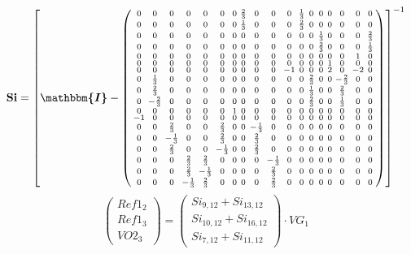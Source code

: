 \documentclass[10pt]{article} \usepackage{amsmath} \usepackage{bbold}
\begin{document}
\[ \mathbf{Si} = \left[ \boldsymbol{\mathbbm{I}}  -
\left(\begin{smallmatrix} 0 & 0 & 0 & 0 & 0 & 0 & 0 & \frac{2}{3} & 0
& 0 & 0 & \frac{1}{3} & 0 & 0 & 0 & 0 & 0 & 0 \\ 0 & 0 & 0 & 0 & 0 & 0
& 0 & \frac{1}{3} & 0 & 0 & 0 & \frac{2}{3} & 0 & 0 & 0 & 0 & 0 & 0 \\
0 & 0 & 0 & 0 & 0 & 0 & 0 & 0 & 0 & 0 & 0 & 0 & 0 & \frac{1}{3} & 0 &
0 & 0 & \frac{2}{3} \\ 0 & 0 & 0 & 0 & 0 & 0 & 0 & 0 & 0 & 0 & 0 & 0 &
0 & \frac{2}{3} & 0 & 0 & 0 & \frac{1}{3} \\ 0 & 0 & 0 & 0 & 0 & 0 & 0
& 0 & 0 & 0 & 0 & 0 & 0 & 0 & 0 & 0 & 1 & 0 \\ 0 & 0 & 0 & 0 & 0 & 0 &
0 & 0 & 0 & 0 & 0 & 0 & 0 & 0 & 1 & 0 & 0 & 0 \\ 0 & 0 & 0 & 0 & 0 & 0
& 0 & 0 & 0 & 0 & -1 & 0 & 0 & 0 & 2 & 0 & -2 & 0 \\ 0 & \frac{1}{3} &
0 & 0 & 0 & 0 & 0 & 0 & 0 & 0 & 0 & 0 & \frac{2}{3} & 0 & 0 &
-\frac{2}{3} & 0 & 0 \\ 0 & \frac{2}{3} & 0 & 0 & 0 & 0 & 0 & 0 & 0 &
0 & 0 & 0 & \frac{1}{3} & 0 & 0 & \frac{2}{3} & 0 & 0 \\ 0 &
-\frac{2}{3} & 0 & 0 & 0 & 0 & 0 & 0 & 0 & 0 & 0 & 0 & \frac{2}{3} & 0
& 0 & \frac{1}{3} & 0 & 0 \\ 0 & 0 & 0 & 0 & 0 & 0 & 1 & 0 & 0 & 0 & 0
& 0 & 0 & 0 & 0 & 0 & 0 & 0 \\ -1 & 0 & 0 & 0 & 0 & 0 & 0 & 0 & 0 & 0
& 0 & 0 & 0 & 0 & 0 & 0 & 0 & 0 \\ 0 & 0 & \frac{2}{3} & 0 & 0 &
\frac{2}{3} & 0 & 0 & -\frac{1}{3} & 0 & 0 & 0 & 0 & 0 & 0 & 0 & 0 & 0
\\ 0 & 0 & -\frac{1}{3} & 0 & 0 & \frac{2}{3} & 0 & 0 & \frac{2}{3} &
0 & 0 & 0 & 0 & 0 & 0 & 0 & 0 & 0 \\ 0 & 0 & \frac{2}{3} & 0 & 0 &
-\frac{1}{3} & 0 & 0 & \frac{2}{3} & 0 & 0 & 0 & 0 & 0 & 0 & 0 & 0 & 0
\\ 0 & 0 & 0 & \frac{2}{3} & \frac{2}{3} & 0 & 0 & 0 & 0 &
-\frac{1}{3} & 0 & 0 & 0 & 0 & 0 & 0 & 0 & 0 \\ 0 & 0 & 0 &
\frac{2}{3} & -\frac{1}{3} & 0 & 0 & 0 & 0 & \frac{2}{3} & 0 & 0 & 0 &
0 & 0 & 0 & 0 & 0 \\ 0 & 0 & 0 & -\frac{1}{3} & \frac{2}{3} & 0 & 0 &
0 & 0 & \frac{2}{3} & 0 & 0 & 0 & 0 & 0 & 0 & 0 & 0
\end{smallmatrix}\right) \right]^{-1} \]
\[ \left(\begin{array}{c} Ref1_{2} \\ Ref1_{3} \\ VO2_{3}
\end{array}\right)=\left(\begin{smallmatrix} Si_{9,12} + Si_{13,12} \\
Si_{10,12} + Si_{16,12} \\ Si_{7,12} + Si_{11,12}
\end{smallmatrix}\right)\cdot VG_{1} \]
\end{document}

